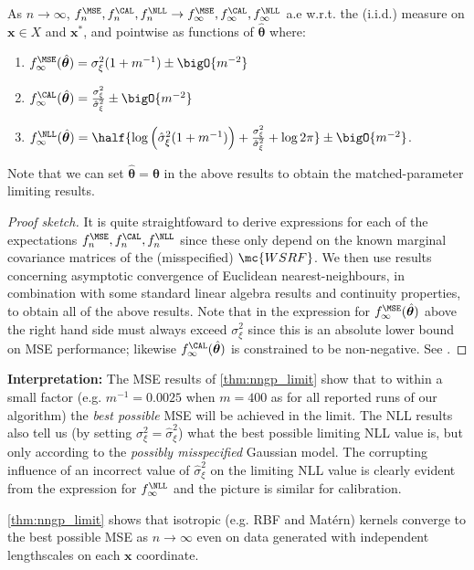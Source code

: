\begin{theorem}
  \label{thm:nngp_limit} 
  As \(n\rightarrow\infty\), \(f_n^{\MSE},f_n^{\CAL},f_n^{\NLL} \rightarrow f_\infty^{\MSE},f_\infty^{\CAL},f_\infty^{\NLL}\) a.e w.r.t. the (i.i.d.) measure on $\mathbf{x} \in X$ and $\mathbf{x^*}$, and pointwise as functions of $\hat{\bm{\theta}}$ where:
  \begin{enumerate}[label=(\roman*)]
    \item  \( f_\infty^{\MSE}(\hat{\bm{\theta}}) = \sigma_\xi^2(1+m^{-1}) \pm \bigO{m^{-2}}\) \label{eq:mse_lim}
    \item  \( f_\infty^{\CAL}(\hat{\bm{\theta}}) = \frac{\sigma_\xi^2}{\hat{\sigma}_\xi^2} \pm \bigO{m^{-2}}\) \label{eq:cal_lim}
    \item \(  f_\infty^{\NLL}(\hat{\bm{\theta}}) =\half \{ \log\left(\hat{\sigma}_\xi^2(1 + m^{-1})\right) + \frac{\sigma_\xi^2}{\hat{\sigma}_\xi^2} +\log2\pi \} \pm \bigO{m^{-2}} \). \label{eq:nll_lim}
  \end{enumerate}
  Note that we can set \(\hat{\bm{\theta}}=\bm{\theta}\) in the above results to obtain the matched-parameter limiting results.
\end{theorem}
\begin{proof}[Proof sketch]
It is quite straightfoward to derive expressions for each of the expectations \(f_n^{\MSE},f_n^{\CAL},f_n^{\NLL}\) since these only depend on the known marginal covariance matrices of the (misspecified) $\mc{WSRF}$. We then use results concerning asymptotic convergence of Euclidean nearest-neighbours, in combination with some standard linear algebra results and continuity properties, to obtain all of the above results. Note that in the expression for \( f_\infty^{\MSE}(\hat{\bm{\theta}})\) above the right hand side must always exceed $\sigma_\xi^2$ since this is an absolute lower bound on MSE performance; likewise \( f_\infty^{\CAL}(\hat{\bm{\theta}})\) is constrained to be non-negative. See .
\end{proof}

\textbf{Interpretation:} The MSE results of \autoref{thm:nngp_limit} show that to within a small factor (e.g. $m^{-1} = 0.0025$ when $m=400$ as for all reported runs of our algorithm) the {\it best possible} MSE will be achieved in the limit. The NLL results also tell us (by setting $\sigma_\xi^2 = \hat{\sigma}_\xi^2$) what the best possible limiting NLL value is, but only according to the {\it possibly misspecified} Gaussian model. The corrupting influence of an incorrect value of $\hat{\sigma}_\xi^2$ on the limiting NLL value is clearly evident from the expression for \(f_\infty^{\NLL}\)  and the picture is similar for calibration.
\begin{remark} 
\label{rem: indep_l}
\autoref{thm:nngp_limit}  shows that isotropic (e.g. RBF and Matérn) kernels converge to the best possible MSE as $n \rightarrow \infty$ even on data generated with independent lengthscales on each $\bm{x}$ coordinate.
\end{remark}

